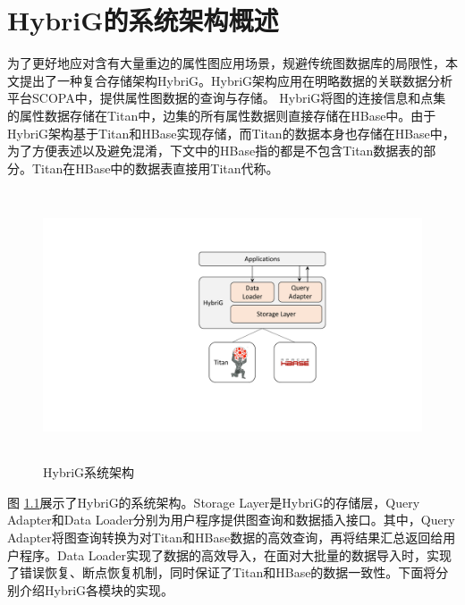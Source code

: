 
\chapter{HybriG的系统架构概述}
为了更好地应对含有大量重边的属性图应用场景，规避传统图数据库的局限性，本文提出了一种复合存储架构HybriG。HybriG架构应用在明略数据的关联数据分析平台SCOPA中，提供属性图数据的查询与存储。
HybriG将图的连接信息和点集的属性数据存储在Titan中，边集的所有属性数据则直接存储在HBase中。由于HybriG架构基于Titan和HBase实现存储，而Titan的数据本身也存储在HBase中，为了方便表述以及避免混淆，下文中的HBase指的都是不包含Titan数据表的部分。Titan在HBase中的数据表直接用Titan代称。

\begin{figure}[htbp]
\centering
\includegraphics[height=80mm]{fig/arch.pdf}
\caption{HybriG系统架构}
\label{fig:arch}
\end{figure}

图 \ref{fig:arch}展示了HybriG的系统架构。Storage Layer是HybriG的存储层，Query Adapter和Data Loader分别为用户程序提供图查询和数据插入接口。其中，Query Adapter将图查询转换为对Titan和HBase数据的高效查询，再将结果汇总返回给用户程序。Data Loader实现了数据的高效导入，在面对大批量的数据导入时，实现了错误恢复、断点恢复机制，同时保证了Titan和HBase的数据一致性。下面将分别介绍HybriG各模块的实现。


